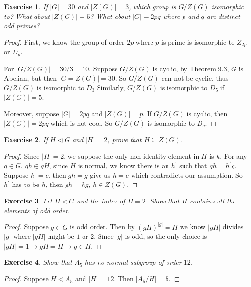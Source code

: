 \documentclass[14pt]{extarticle}
\newtheorem{exercise}{Exercise}[section]
\newcommand{\normalin}{\triangleleft}
\newcommand{\1}{\{ e \}}
\begin{document}
\setcounter{exercise}{70}
\begin{exercise}
  If $|G| = 30$ and $|Z(G)| = 3$, which group is $G/Z(G)$ isomorphic to?
  What about $|Z(G)| = 5$? 
  What about $|G| = 2pq$ where $p$ and $q$ are distinct odd primes?
\end{exercise}
\begin{proof}
  First, we know the group of order $2p$ where $p$ is prime is isomorphic to
  $Z_{2p}$ or $D_p$.

  For $|G/Z(G)| = 30/3 = 10$. 
  Suppose $G/Z(G)$ is cyclic,
  by Theorem 9.3, $G$ is Abelian, but then $|G = Z(G)| = 30$.
  So $G/Z(G)$ can not be cyclic, thus $G/Z(G)$ is isomorphic to $D_3$
  Similarly, $G/Z(G)$ is isomorphic to $D_5$ if $|Z(G)| = 5$.

  Moreover, suppose $|G| = 2pq$ and $|Z(G)| = p$.
  If $G/Z(G)$ is cyclic, then $|Z(G)| = 2pq$ which is not cool.
  So $G/Z(G)$ is isomorphic to $D_q$.
\end{proof}

\begin{exercise}
  If $H \normalin G$ and $|H| = 2$, prove that $H \subseteq Z(G)$.
\end{exercise}
\begin{proof}
  Since $|H| = 2$, we suppose the only non-identity element in $H$ is $h$.
  For any $g \in G$, $gh \in gH$, since $H$ is normal,
  we know there is an $h^\prime$ such that $gh = h^\prime g$.
  Suppose $h^\prime = e$, then $gh = g$ give us $h = e$ which contradicts our assumption.
  So $h^\prime$ has to be $h$, then $gh = hg$, $h \in Z(G)$.
\end{proof}

\setcounter{exercise}{73}
\begin{exercise}
  Let $H \normalin G$ and the index of $H = 2$.
  Show that $H$ contains all the elements of odd order.
\end{exercise}
\begin{proof}
  Suppose $g \in G$ is odd order. Then by $(gH)^|g| = H$ we know $|gH|$ divides $|g|$
  where $|gH|$ might be $1$ or $2$.
  Since $|g|$ is odd, so the only choice is $|gH| = 1 \rightarrow gH = H \rightarrow g \in H$.
\end{proof}

\setcounter{exercise}{76}
\begin{exercise}
  Show that $A_5$ has no normal subgroup of order $12$.
\end{exercise}
\begin{proof}
  Suppose $H \normalin A_5$ and $|H| = 12$. Then $|A_5/H| = 5$.
\end{proof}
\end{document}
